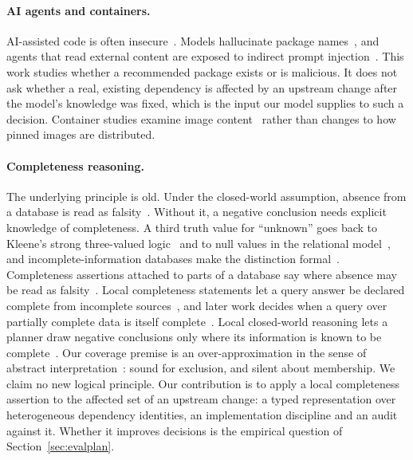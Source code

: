 \documentclass[11pt,a4paper]{article}
\begin{document}
\paragraph{AI agents and containers.} AI-assisted code is often
insecure~\cite{pearce2022asleep}. Models hallucinate package
names~\cite{spracklen2025package,krishna2025phantoms}, and agents that
read external content are exposed to indirect prompt
injection~\cite{greshake2023indirect,debenedetti2024agentdojo}. This
work studies whether a recommended package exists or is malicious. It
does not ask whether a real, existing dependency is affected by an
upstream change after the model's knowledge was fixed, which is the
input our model supplies to such a decision.
Container studies examine image content~\cite{shu2017dockerhub,zerouali2019outdated,cito2017docker,lin2020dockerhub}
rather than changes to how pinned images are distributed.

\paragraph{Completeness reasoning.} The underlying principle is old.
Under the closed-world assumption, absence from a database is read as
falsity~\cite{reiter1978closed}. Without it, a negative conclusion
needs explicit knowledge of completeness. A third truth value for
``unknown'' goes back to Kleene's strong three-valued
logic~\cite{kleene1952introduction} and to null values in the
relational model~\cite{codd1979extending}, and incomplete-information
databases make the distinction formal~\cite{imielinski1984incomplete}.
Completeness assertions attached to parts of a database say where
absence may be read as falsity~\cite{motro1989integrity}. Local
completeness statements let a query answer be declared complete from
incomplete sources~\cite{levy1996obtaining}, and later work decides
when a query over partially complete data is itself
complete~\cite{razniewski2011completeness}. Local
closed-world reasoning lets a planner draw negative conclusions only
where its information is known to be complete~\cite{etzioni1997closed}.
Our coverage premise is an over-approximation in the sense of abstract
interpretation~\cite{cousot1977abstract}: sound for exclusion, and
silent about membership. We claim no new logical principle. Our
contribution is to apply a local completeness assertion to the affected
set of an upstream change: a typed representation over heterogeneous
dependency identities, an implementation discipline and an audit
against it. Whether it improves decisions is the empirical question of
Section~\ref{sec:evalplan}.
\end{document}
